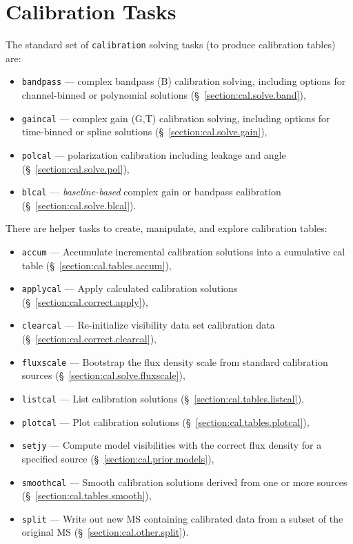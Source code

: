 \section{Calibration Tasks}
\label{section:cal.tasks}

The standard set of {\tt calibration} solving tasks (to produce
calibration tables) are:
\begin{itemize}
   \item {\tt bandpass} --- complex bandpass (B) calibration solving,
      including options for channel-binned or polynomial solutions
      (\S~\ref{section:cal.solve.band}),
   \item {\tt gaincal} --- complex gain (G,T) calibration solving, 
      including options for time-binned or spline solutions
      (\S~\ref{section:cal.solve.gain}),
   \item {\tt polcal} --- polarization calibration including leakage
      and angle
      (\S~\ref{section:cal.solve.pol}),
   \item {\tt blcal} --- {\it baseline-based} complex gain or bandpass
      calibration
      (\S~\ref{section:cal.solve.blcal}).
\end{itemize}

There are helper tasks to create, manipulate, and explore calibration 
tables:
\begin{itemize}
   \item {\tt accum} --- Accumulate incremental calibration solutions
      into a cumulative cal table (\S~\ref{section:cal.tables.accum}),
   \item {\tt applycal} --- Apply calculated calibration solutions
      (\S~\ref{section:cal.correct.apply}),
   \item {\tt clearcal} --- Re-initialize visibility data set
     calibration data (\S~\ref{section:cal.correct.clearcal}),
   \item {\tt fluxscale} --- Bootstrap the flux density scale from
      standard calibration sources (\S~\ref{section:cal.solve.fluxscale}), 
   \item {\tt listcal} --- List calibration solutions 
      (\S~\ref{section:cal.tables.listcal}),
   \item {\tt plotcal} --- Plot calibration solutions 
      (\S~\ref{section:cal.tables.plotcal}),
    \item {\tt setjy} --- Compute model visibilities with the correct
      flux density for a specified source
      (\S~\ref{section:cal.prior.models}),
   \item {\tt smoothcal} --- Smooth calibration solutions derived from
      one or more sources (\S~\ref{section:cal.tables.smooth}),
   \item {\tt split} --- Write out new MS containing calibrated data
      from a subset of the original MS (\S~\ref{section:cal.other.split}).
\end{itemize}


